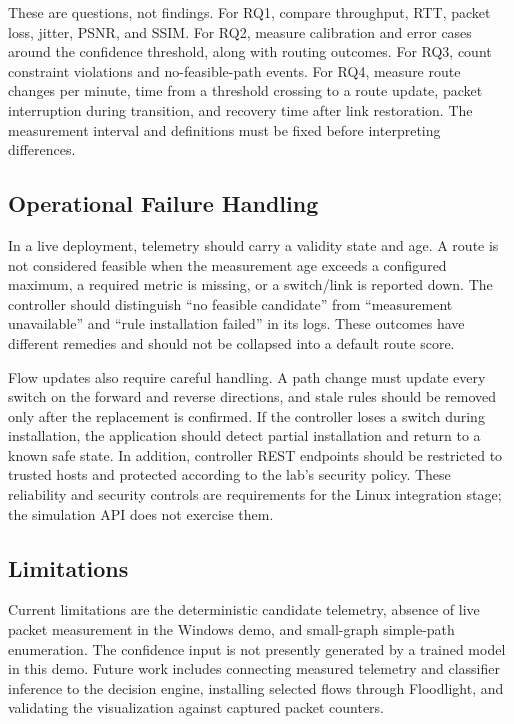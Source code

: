 \documentclass[conference]{IEEEtran}
\begin{document}
These are questions, not findings. For RQ1, compare throughput, RTT, packet loss, jitter, PSNR, and SSIM. For RQ2, measure calibration and error cases around the confidence threshold, along with routing outcomes. For RQ3, count constraint violations and no-feasible-path events. For RQ4, measure route changes per minute, time from a threshold crossing to a route update, packet interruption during transition, and recovery time after link restoration. The measurement interval and definitions must be fixed before interpreting differences.

\subsection{Operational Failure Handling}
In a live deployment, telemetry should carry a validity state and age. A route is not considered feasible when the measurement age exceeds a configured maximum, a required metric is missing, or a switch/link is reported down. The controller should distinguish ``no feasible candidate'' from ``measurement unavailable'' and ``rule installation failed'' in its logs. These outcomes have different remedies and should not be collapsed into a default route score.

Flow updates also require careful handling. A path change must update every switch on the forward and reverse directions, and stale rules should be removed only after the replacement is confirmed. If the controller loses a switch during installation, the application should detect partial installation and return to a known safe state. In addition, controller REST endpoints should be restricted to trusted hosts and protected according to the lab's security policy. These reliability and security controls are requirements for the Linux integration stage; the simulation API does not exercise them.

\subsection{Limitations}
Current limitations are the deterministic candidate telemetry, absence of live packet measurement in the Windows demo, and small-graph simple-path enumeration. The confidence input is not presently generated by a trained model in this demo. Future work includes connecting measured telemetry and classifier inference to the decision engine, installing selected flows through Floodlight, and validating the visualization against captured packet counters.
\end{document}
